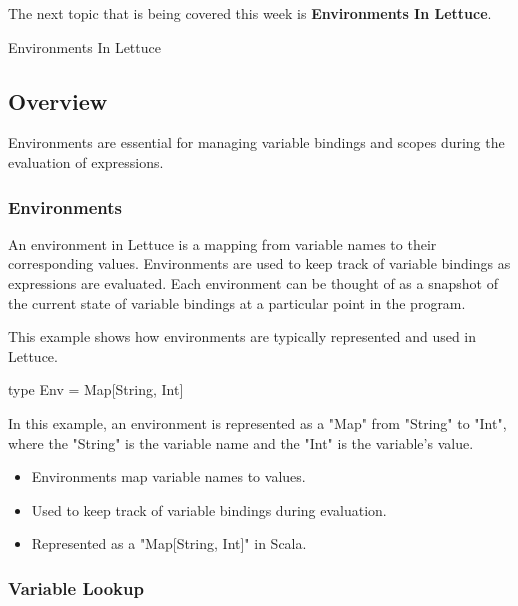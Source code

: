 The next topic that is being covered this week is \textbf{Environments In Lettuce}.

\begin{notes}{Environments In Lettuce}
    \subsection*{Overview}

    Environments are essential for managing variable bindings and scopes during the evaluation of expressions.
    
    \subsubsection*{Environments}
    
    An environment in Lettuce is a mapping from variable names to their corresponding values. Environments are used to keep track of variable bindings as expressions are evaluated. Each environment 
    can be thought of as a snapshot of the current state of variable bindings at a particular point in the program.
    
    \begin{highlight}[Environments]
    
        This example shows how environments are typically represented and used in Lettuce.
    
    \begin{code}[Scala]
    type Env = Map[String, Int]
    \end{code}
    
        In this example, an environment is represented as a "Map" from "String" to "Int", where the "String" is the variable name and the "Int" is the variable's value.
        
        \begin{itemize}
            \item Environments map variable names to values.
            \item Used to keep track of variable bindings during evaluation.
            \item Represented as a "Map[String, Int]" in Scala.
        \end{itemize}
    
    \end{highlight}
    
    \subsubsection*{Variable Lookup}
    

\end{notes}
